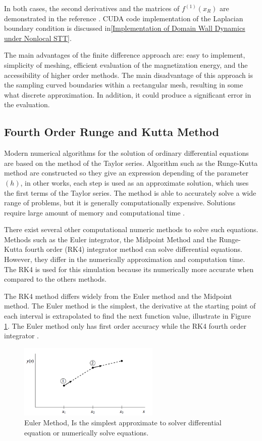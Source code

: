 In both cases, the second derivatives and the matrices of $f^{(1)}(x_R)$ are demonstrated in the reference \cite{methods}. CUDA code implementation of the Laplacian boundary condition is discussed in\ref{Implementation of Domain Wall Dynamics under Nonlocal STT}.

The main advantages of the finite difference approach are: easy to implement, simplicity of meshing, efficient evaluation of the magnetization energy, and the accessibility of higher order methods. The main disadvantage of this approach is the sampling curved boundaries within a rectangular mesh, resulting in some what discrete approximation. In addition, it could produce a significant error in the evaluation.

\subsection{Fourth Order Runge and Kutta Method}

 Modern numerical algorithms for the solution of ordinary differential equations are based on the method of the Taylor series. Algorithm such as the Runge-Kutta method are constructed so they give an expression depending of the parameter $(h)$, in other works, each step is used as an approximate solution, which uses the first terms of the Taylor series. The method is able to accurately solve a wide range of problems, but it is generally computationally expensive. Solutions require large amount of memory and computational time \cite{numerical}.

There exist several other computational numeric methods to solve such equations. Methods such as the Euler integrator, the Midpoint Method and the Runge-Kutta fourth order (RK4) integrator method can solve differential equations. However, they differ in the numerically approximation and computation time. The RK4 is used for this simulation because its numerically more accurate when compared to the others methods.

The RK4 method differs widely from the Euler method and the Midpoint method. The Euler method is the simplest, the derivative at the starting point of each interval is extrapolated to find the next function value, illustrate in Figure \ref{fig:euler}. The Euler method only has first order accuracy while the RK4 fourth order integrator \cite{numerical}.

\begin{figure}[htbp]
	\centering
		\includegraphics[width=0.6\textwidth]{Figures/euler.png}
		\smallskip
	\caption[Euler Method]{Euler Method, Is the simplest approximate to solver differential equation or numerically solve equations.}
	\label{fig:euler}
\end{figure}


